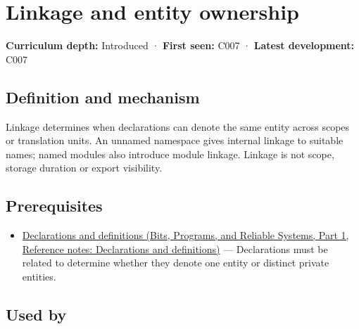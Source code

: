 \hypertarget{appendix-74a0ec818c18}{}\label{referencestart:appendix-74a0ec818c18}
\section{Linkage and entity ownership}\label{appendix-74a0ec818c18-linkage-and-entity-ownership}

\hypertarget{appendix-74a0ec818c18-linkage-and-entity-ownership}{}

\textbf{Curriculum depth:} Introduced · \textbf{First seen:} C007 · \textbf{Latest development:} C007

\begin{allmightroledefinition}

\subsection{Definition and mechanism}\label{appendix-74a0ec818c18-definition-and-mechanism}

\hypertarget{appendix-74a0ec818c18-definition-and-mechanism}{}

Linkage determines when declarations can denote the same entity across scopes or translation units. An unnamed namespace gives internal linkage to suitable names; named modules also introduce module linkage. Linkage is not scope, storage duration or export visibility.

\end{allmightroledefinition}

\subsection{Prerequisites}\label{appendix-74a0ec818c18-prerequisites}

\hypertarget{appendix-74a0ec818c18-prerequisites}{}

\begin{itemize}
\tightlist
\item
  \href{../01-Bits-Programs-and-Reliable-Systems-P01/main.pdf\#appendix-2e4d494c2d94}{Declarations and definitions (Bits, Programs, and Reliable Systems, Part 1, Reference notes: Declarations and definitions)} --- Declarations must be related to determine whether they denote one entity or distinct private entities.
\end{itemize}

\subsection{Used by}\label{appendix-74a0ec818c18-used-by}

